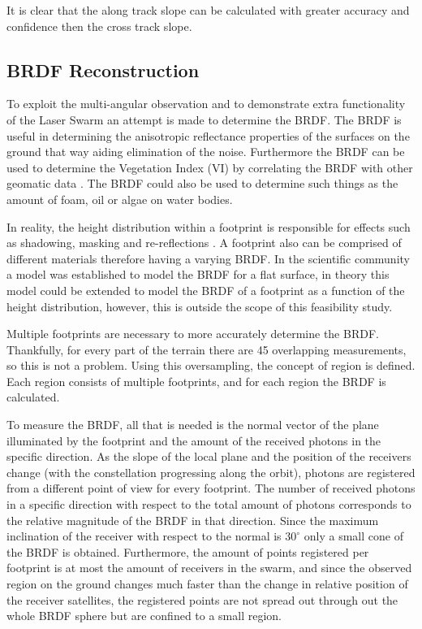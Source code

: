 It is clear that the along track slope can be calculated with greater accuracy and confidence then the cross track slope.

\subsection{\ac{BRDF} Reconstruction}
\label{sec:BRDFReconstuction}

To exploit the multi-angular observation and to demonstrate extra functionality of the Laser Swarm an attempt is made to determine the \ac{BRDF}. 
The \ac{BRDF} is useful in determining the anisotropic reflectance properties of the surfaces on the ground that way aiding elimination of the noise. Furthermore the \ac{BRDF} can be used to determine the Vegetation Index (VI) by correlating the \ac{BRDF} with other geomatic data \cite{BRDFwanner}. The \ac{BRDF} could also be used to determine such things as the amount of foam, oil or algae on water bodies.

In reality, the height distribution within a footprint is responsible for effects such as shadowing, masking and re-reflections \cite{BRDFsparrow}. A footprint also can be comprised of different materials therefore having a varying \ac{BRDF}. In the scientific community a model was established to model the \ac{BRDF} for a flat surface, in theory this model could be extended to model the \ac{BRDF} of a footprint as a function of the height distribution, however, this is outside the scope of this feasibility study. 

Multiple footprints are necessary to more accurately determine the \ac{BRDF}. Thankfully, for every part of the terrain there are 45 overlapping measurements, so this is not a problem. Using this oversampling, the concept of region is defined. Each region consists of multiple footprints, and for each region the \ac{BRDF} is calculated.

To measure the \ac{BRDF}, all that is needed is the normal vector of the plane illuminated by the footprint and the amount of the received photons in the specific direction. As the slope of the local plane and the position of the receivers change (with the constellation progressing along the orbit), photons are registered from a different point of view for every footprint. The number of received photons in a specific direction with respect to the total amount of photons corresponds to the relative magnitude of the \ac{BRDF} in that direction. Since the maximum inclination of the receiver with respect to the normal is $30^\circ$ only a small cone of the \ac{BRDF} is obtained. Furthermore, the amount of points registered per footprint is at most the amount of receivers in the swarm, and since the observed region on the ground changes much faster than the change in relative position of the receiver satellites, the registered points are not spread out through out the whole \ac{BRDF} sphere but are confined to a small region. 

